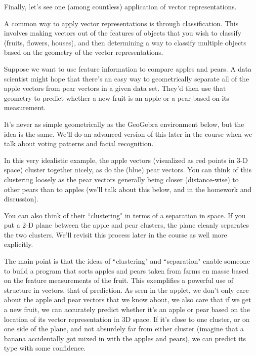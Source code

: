 \documentclass{ximera}
\begin{document}
\begin{exploration}

Finally, let's see one (among countless) application of vector representations.

  A common way to apply vector representations is through classification. This involves making vectors out of the features of objects that you wish to classify (fruits, flowers, houses), and then determining a way to classify multiple objects based on the geometry of the vector representations.


\begin{example}

    Suppose we want to use feature information to compare apples and pears. A data scientist might hope that there's an easy way to geometrically separate all of the apple vectors from pear vectors in a given data set. They'd then use that geometry to predict whether a new fruit is an apple or a pear based on its measurement. 

    It's never as simple geometrically as the GeoGebra environment below, but the idea is the same. We'll do an advanced version of this later in the course when we talk about voting patterns and facial recognition.

    

    \begin{center}
    \end{center}

    In this very idealistic example, the apple vectors (visualized as red points in 3-D space) cluster together nicely, as do the (blue) pear vectors. You can think of this clustering loosely as the pear vectors generally being closer (distance-wise) to other pears than to apples (we'll talk about this below, and in the homework and discussion).
    
    You can also think of their ``clustering" in terms of a separation in space. If you put a 2-D plane between the apple and pear clusters, the plane cleanly separates the two clusters. We'll revisit this process later in the course as well more explicitly. 
    
    The main point is that the ideas of ``clustering" and ``separation" enable someone to build a program that sorts apples and pears taken from farms en masse based on the feature measurements of the fruit. This exemplifies a powerful use of structure in vectors, that of prediction. As seen in the applet, we don't only care about the apple and pear vectors that we know about, we also care that if we get a new fruit, we can accurately predict whether it's an apple or pear based on the location of its vector representation in 3D space. If it's close to one cluster, or on one side of the plane, and not absurdely far from either cluster (imagine that a banana accidentally got mixed in with the apples and pears), we can predict its type with some confidence.

    
\end{example}
\end{exploration}
\end{document}
